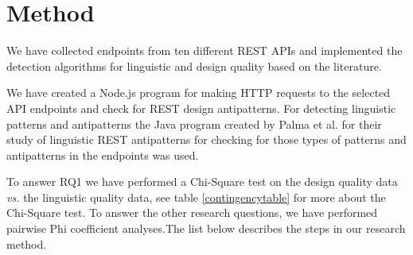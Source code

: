 \section{Method}\label{sec:Method}

We have collected endpoints from ten different REST APIs and implemented the detection algorithms for linguistic and design quality based on the literature. 

We have created a Node.js program for making HTTP requests to the selected API endpoints and check for REST design antipatterns. For detecting linguistic patterns and antipatterns the Java program created by Palma et al. for their study of linguistic REST antipatterns \cite{linguistic} for checking for those types of patterns and antipatterns in the endpoints was used. 

To answer RQ1 we have performed a Chi-Square test on the design quality data \textit{vs.} the linguistic quality data, see table \ref{contingencytable} for more about the Chi-Square test. To answer the other research questions, we have performed pairwise Phi coefficient analyses.The list below describes the steps in our research method.

